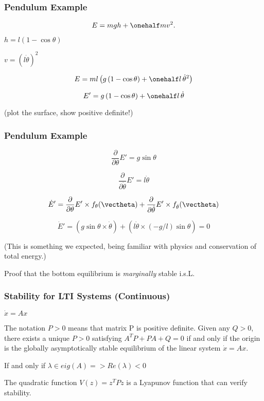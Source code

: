 \documentclass[12pt]{beamer}
\begin{document}
\begin{frame}
\frametitle{Pendulum Example}

\[
E = mgh + \onehalf m v^2.
\]

$h = l(1-\cos\theta)$

$v = (l\dot\theta)^2$

\[
E
	= ml \left( g \, (1-\cos\theta) + \onehalf l \, \dot\theta^2 \right)
\]

\[
E' = g \, (1-\cos\theta) + \onehalf l \, \dot\theta
\]

(plot the surface, show positive definite!)

\end{frame}



\begin{frame}
\frametitle{Pendulum Example}
\[
\frac{\partial}{\partial\theta} E' = g \sin \theta
\]

\[
\frac{\partial}{\partial\dot\theta} E' = l \dot\theta
\]

\[
\dot E' =
	\frac{\partial}{\partial\theta} E' 
		\times f_{\theta}(\vectheta)
	+ \frac{\partial}{\partial\dot\theta} E'
		\times f_{\dot\theta}(\vectheta)
\]


\[
\dot E' =
	\left( g \sin\theta \times \dot\theta \right)
	+ \left( l \dot\theta \times (-g/l) \sin \theta \right) = 0
\]

(This is something we expected, being familiar with physics and conservation of total energy.)

Proof that the bottom equilibrium is \emph{marginally} stable i.s.L.

\end{frame}





\begin{frame}
\frametitle{Stability for LTI Systems (Continuous)}
$\dot x = Ax$

The notation $P > 0$ means that matrix P is positive definite.
Given any $Q > 0$, there exists a unique $P > 0$ satisfying 
$A^T P + P A + Q = 0$ if and only if the origin is the globally asymptotically stable equilibrium of the linear system $\dot x = A x$.

If and only if $\lambda \in eig(A) => Re(\lambda) < 0$

The quadratic function $V(z) = z^T P z$ is a Lyapunov function that can verify stability.

\end{frame}
\end{document}
